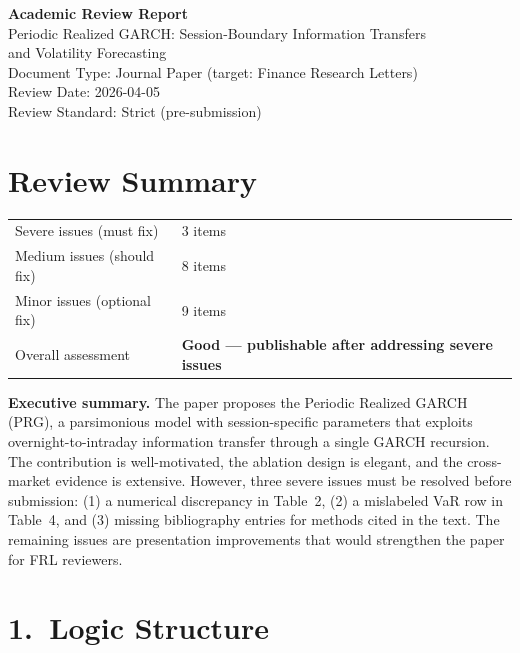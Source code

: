 \documentclass[12pt,a4paper]{article}
\begin{document}
\begin{center}
{\Large\bfseries Academic Review Report}\\[0.5em]
{\large Periodic Realized GARCH: Session-Boundary Information Transfers\\
and Volatility Forecasting}\\[0.5em]
{\normalsize Document Type: Journal Paper (target: Finance Research Letters)}\\
{\normalsize Review Date: 2026-04-05}\\
{\normalsize Review Standard: Strict (pre-submission)}
\end{center}

\bigskip

\section*{Review Summary}

\begin{tabular}{ll}
\textcolor{errorred}{Severe issues (must fix)} & 3 items \\
\textcolor{warncolor}{Medium issues (should fix)} & 8 items \\
Minor issues (optional fix) & 9 items \\
Overall assessment & \textbf{Good --- publishable after addressing severe issues} \\
\end{tabular}

\medskip
\noindent
\textbf{Executive summary.}
The paper proposes the Periodic Realized GARCH (PRG), a parsimonious model with session-specific parameters that exploits overnight-to-intraday information transfer through a single GARCH recursion. The contribution is well-motivated, the ablation design is elegant, and the cross-market evidence is extensive. However, three severe issues must be resolved before submission: (1) a numerical discrepancy in Table~2, (2) a mislabeled VaR row in Table~4, and (3) missing bibliography entries for methods cited in the text. The remaining issues are presentation improvements that would strengthen the paper for FRL reviewers.

\section*{1.\ Logic Structure}
\end{document}
